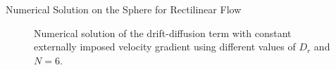 \begin{frame}{Numerical Solution on the Sphere for Rectilinear Flow}
\begin{figure}[H]
\begin{minipage}{0.4\textwidth}
		\end{minipage}
		\caption{Numerical solution of the drift-diffusion term with constant externally imposed velocity gradient using different values of $D_r$ and $N = 6$.}
	\end{figure}
\end{frame}
